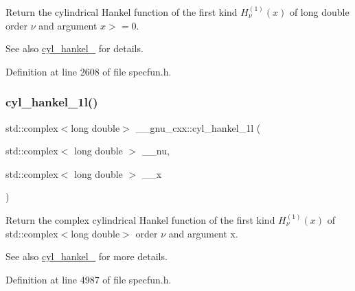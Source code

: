Return the cylindrical Hankel function of the first kind $ H^{(1)}_\nu(x) $ of {\ttfamily long double} order $ \nu $ and argument $ x >= 0 $.

\begin{DoxySeeAlso}{See also}
\hyperlink{group__mathsf__gnu_ga5329bba77d10a9d2f15d9bbe43a70db3}{cyl\+\_\+hankel\+\_} for details. 
\end{DoxySeeAlso}


Definition at line 2608 of file specfun.\+h.

\mbox{\label{group__mathsf__gnu_ga6900f79ec70673bcb001538aec74e07c}} 
\subsubsection{\texorpdfstring{cyl\+\_\+hankel\+\_\+1l()}{cyl\_hankel\_1l()}\hspace{0.1cm}{\footnotesize\ttfamily [2/2]}}
{\footnotesize\ttfamily std\+::complex$<$long double$>$ \+\_\+\+\_\+gnu\+\_\+cxx\+::cyl\+\_\+hankel\+\_\+1l (\begin{DoxyParamCaption}\item[{std\+::complex$<$ long double $>$}]{\+\_\+\+\_\+nu,  }\item[{std\+::complex$<$ long double $>$}]{\+\_\+\+\_\+x }\end{DoxyParamCaption})\hspace{0.3cm}{\ttfamily [inline]}}

Return the complex cylindrical Hankel function of the first kind $ H^{(1)}_\nu(x) $ of {\ttfamily std\+::complex$<$long double$>$} order $ \nu $ and argument {\ttfamily x}.

\begin{DoxySeeAlso}{See also}
\hyperlink{group__mathsf__gnu_ga5329bba77d10a9d2f15d9bbe43a70db3}{cyl\+\_\+hankel\+\_} for more details. 
\end{DoxySeeAlso}


Definition at line 4987 of file specfun.\+h.

\mbox{\label{group__mathsf__gnu_ga7ebc71dd48ac97255d72f5f5f43dfd8e}} 
